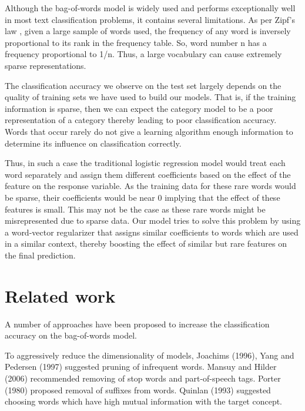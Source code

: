 Although the bag-of-words model is widely used and performs exceptionally well in most text classification problems, it contains several limitations. As per Zipf's law \cite{li1992random}, given a large sample of words used, the frequency of any word is inversely proportional to its rank in the frequency table. So, word number n has a frequency proportional to 1/n. Thus, a large vocabulary can cause extremely sparse representations. 

The classification accuracy we observe on the test set largely depends on the quality of training sets we have used to build our models. That is, if the training information is sparse, then we can expect the category model to be a poor representation of a category thereby leading to poor classification accuracy. Words that occur rarely do not give a learning algorithm enough information to determine its influence on classification correctly.

Thus, in such a case the traditional logistic regression model would treat each word separately and assign them different coefficients based on the effect of the feature on the response variable. As the training data for these rare words would be sparse, their coefficients would be near 0 implying that the effect of these features is small. This may not be the case as these rare words might be misrepresented due to sparse data. Our model tries to solve this problem by using a word-vector regularizer that assigns similar coefficients to words which are used in a similar context, thereby boosting the effect of similar but rare features on the final prediction.

\chapter{Related work}

A number of approaches have been proposed to increase the classification accuracy on the bag-of-words model.

To aggressively reduce the dimensionality of models, Joachims \cite{joachims1996probabilistic} (1996), Yang and Pedersen\cite{yang1997comparative} (1997) suggested pruning of infrequent words. Mansuy and Hilder \cite{mansuy2006characterization} (2006) recommended removing of stop words and part-of-speech tags. Porter \cite{porter1980algorithm} (1980) proposed removal of suffixes from words. Quinlan \cite{quinlan2014c4} (1993) suggested choosing words which have high mutual information with the target concept.

